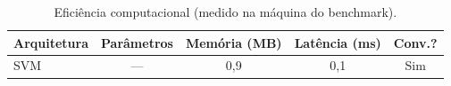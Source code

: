 \begin{table}[H]
\centering
\caption{Eficiência computacional (medido na máquina do benchmark).}
\label{tab:bench_eficiencia}
\small\singlespacing
\begin{tabular}{lcccc}
\toprule
\textbf{Arquitetura} & \textbf{Parâmetros} & \textbf{Memória (MB)} & \textbf{Latência (ms)} & \textbf{Conv.?} \\
\midrule
SVM & --- & 0,9 & 0,1 & \textcolor{successgreen}{Sim} \\
\bottomrule
\end{tabular}
\end{table}
